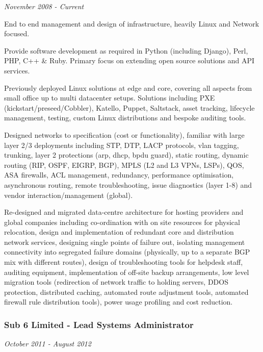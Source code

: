 \emph{November 2008 - Current}

End to end management and design of infrastructure, heavily Linux and
Network focused.

Provide software development as required in Python (including Django),
Perl, PHP, C++ \& Ruby. Primary focus on extending open source solutions
and API services.

Previously deployed Linux solutions at edge and core, covering all
aspects from small office up to multi datacenter setups. Solutions
including PXE (kickstart/preseed/Cobbler), Katello, Puppet, Saltstack,
asset tracking, lifecycle management, testing, custom Linux
distributions and bespoke auditing tools.

Designed networks to specification (cost or functionality), familiar
with large layer 2/3 deployments including STP, DTP, LACP protocols,
vlan tagging, trunking, layer 2 protections (arp, dhcp, bpdu guard),
static routing, dynamic routing (RIP, OSPF, EIGRP, BGP), MPLS (L2 and L3
VPNs, LSPs), QOS, ASA firewalls, ACL management, redundancy, performance
optimisation, asynchronous routing, remote troubleshooting, issue
diagnostics (layer 1-8) and vendor interaction/management (global).

Re-designed and migrated data-centre architecture for hosting providers
and global companies including co-ordination with on site resources for
physical relocation, design and implementation of redundant core and
distribution network services, designing single points of failure out,
isolating management connectivity into segregated failure domains
(physically, up to a separate BGP mix with different routes), design of
troubleshooting tools for helpdesk staff, auditing equipment,
implementation of off-site backup arrangements, low level migration
tools (redirection of network traffic to holding servers, DDOS
protection, distributed caching, automated route adjustment tools,
automated firewall rule distribution tools), power usage profiling and
cost reduction.

\subsubsection{Sub 6 Limited - Lead Systems
Administrator}\label{sub-6-limited---lead-systems-administrator}

\emph{October 2011 - August 2012}

